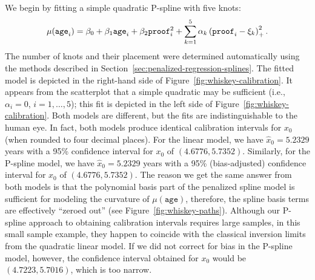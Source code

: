 \documentclass[cmfont,usenames,dvipsnames,leqno]{afit-etd}\usepackage[]{graphicx}\usepackage[]{color}
\newcommand{\wh}[1]{\ensuremath{\widehat{#1}}}
\begin{document}
We begin by fitting a simple quadratic \ac{P-spline} with five knots:
\begin{equation*}
  \mu(\text{\texttt{age}}_i) = \beta_0 + \beta_1\text{\texttt{age}}_i + \beta_2\text{\texttt{proof}}_i^2 + \sum_{k = 1}^5\alpha_k\left( \text{\texttt{proof}}_i - \xi_k \right)_+^2.
\end{equation*}
The number of knots and their placement were determined automatically using the methods described in Section~\ref{sec:penalized-regression-splines}. The fitted model is depicted in the right-hand side of Figure~\ref{fig:whiskey-calibration}. It appears from the scatterplot that a simple quadratic may be sufficient (i.e., $\alpha_i = 0$, $i = 1, \dotsc, 5$); this fit is depicted in the left side of Figure~\ref{fig:whiskey-calibration}. Both models are different, but the fits are indistinguishable to the human eye. In fact, both models produce identical calibration intervals for $x_0$ (when rounded to four decimal places). For the linear model, we have $\wh{x}_0 = 5.2329$ years with a 95\% confidence interval for $x_0$ of $(4.6776, 5.7352)$. Similarly, for the \ac{P-spline} model, we have $\wh{x}_0 = 5.2329$ years with a 95\% (bias-adjusted) confidence interval for $x_0$ of $(4.6776, 5.7352)$. The reason we get the same answer from both models is that the polynomial basis part of the penalized spline model is sufficient for modeling the curvature of $\mu(\texttt{age})$, therefore, the spline basis terms are effectively ``zeroed out'' (see Figure~\ref{fig:whiskey-paths}). Although our \ac{P-spline} approach to obtaining calibration intervals requires large samples, in this small sample example, they happen to coincide with the classical inversion limits from the quadratic linear model. If we did not correct for bias in the \ac{P-spline} model, however, the confidence interval obtained for $x_0$ would be $(4.7223, 5.7016)$, which is too narrow.
\end{document}
